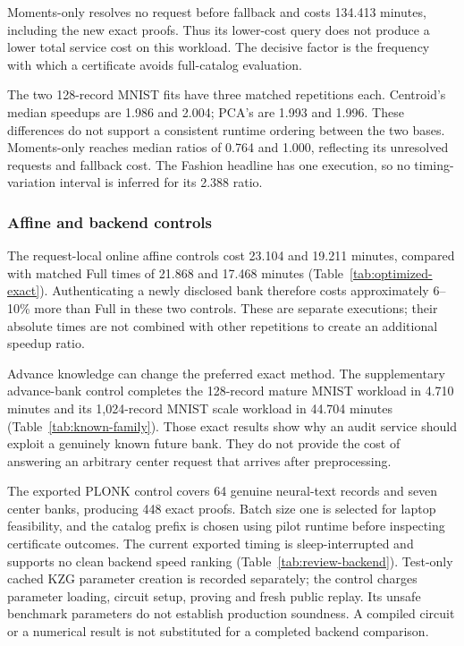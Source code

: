 Moments-only resolves no request before fallback and costs 134.413 minutes,
including the new exact proofs. Thus its lower-cost query does not produce
a lower total service cost on this workload. The decisive factor is the
frequency with which a certificate avoids full-catalog evaluation.

The two 128-record MNIST fits have three matched repetitions each.
Centroid's median speedups are 1.986 and 2.004; PCA's are 1.993 and 1.996.
These differences do not support a consistent runtime ordering between the
two bases. Moments-only reaches median ratios of 0.764 and 1.000, reflecting
its unresolved requests and fallback cost. The Fashion headline has one
execution, so no timing-variation interval is inferred for its 2.388 ratio.



\subsubsection{Affine and backend controls}
The request-local online affine controls cost 23.104 and 19.211 minutes,
compared with matched Full times of 21.868 and 17.468 minutes
(Table~\ref{tab:optimized-exact}). Authenticating a newly disclosed bank
therefore costs approximately 6--10\% more than Full in these two controls.
These are separate executions; their absolute times are not combined with
other repetitions to create an additional speedup ratio.


Advance knowledge can change the preferred exact method. The supplementary
advance-bank control completes the 128-record mature MNIST workload in
4.710 minutes and its 1,024-record MNIST scale workload in 44.704 minutes
(Table~\ref{tab:known-family}). Those exact results show why an audit service
should exploit a genuinely known future bank. They do not provide the cost
of answering an arbitrary center request that arrives after preprocessing.

The exported PLONK control covers 64 genuine neural-text records and seven
center banks, producing 448 exact proofs. Batch size one is selected for
laptop feasibility, and the catalog prefix is chosen using pilot runtime
before inspecting certificate outcomes. The current exported timing is
sleep-interrupted and supports no clean backend speed ranking
(Table~\ref{tab:review-backend}). Test-only cached KZG parameter creation is
recorded separately; the control charges parameter loading, circuit setup,
proving and fresh public replay. Its unsafe benchmark parameters do not
establish production soundness. A compiled circuit or a numerical result is
not substituted for a completed backend comparison.


